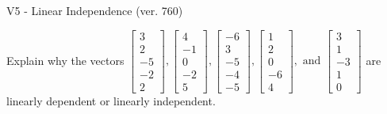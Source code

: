 \begin{exercise}
  \begin{exerciseTitle}V5 - Linear Independence (ver. 760)\end{exerciseTitle}
  \begin{exerciseStatement}
    Explain why the vectors \(\left[\begin{array}{r}
3 \\
2 \\
-5 \\
-2 \\
2
\end{array}\right] , \left[\begin{array}{r}
4 \\
-1 \\
0 \\
-2 \\
5
\end{array}\right] , \left[\begin{array}{r}
-6 \\
3 \\
-5 \\
-4 \\
-5
\end{array}\right] , \left[\begin{array}{r}
1 \\
2 \\
0 \\
-6 \\
4
\end{array}\right] , \text{ and } \left[\begin{array}{r}
3 \\
1 \\
-3 \\
1 \\
0
\end{array}\right]\) are linearly dependent or linearly independent.	



\end{exerciseStatement}
\end{exercise}
